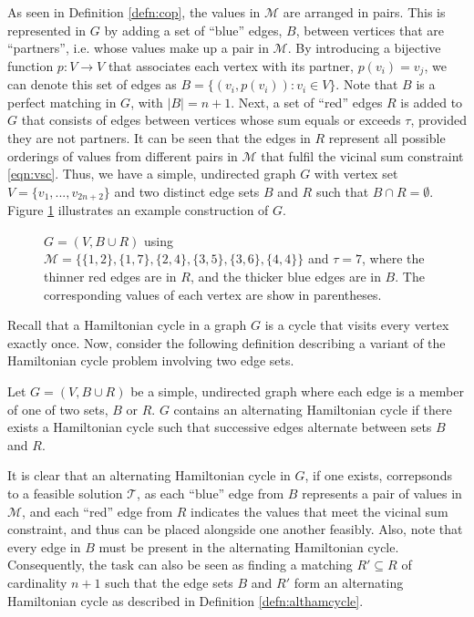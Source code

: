 \documentclass[runningheads]{llncs}
\begin{document}
As seen in Definition \ref{defn:cop}, the values in $\mathcal{M}$ are arranged in pairs. This is represented in $G$ by adding a set of ``blue'' edges, $B$, between vertices that are ``partners'', i.e. whose values make up a pair in $\mathcal{M}$. By introducing a bijective function $p: V \to V$ that associates each vertex with its partner, $p(v_i) = v_j$, we can denote this set of edges as $B = \{(v_i, p(v_i)) : v_i \in V\}$. Note that $B$ is a perfect matching in $G$, with $|B| = n+1$. Next, a set of ``red'' edges $R$ is added to $G$ that consists of edges between vertices whose sum equals or exceeds $\tau$, provided they are not partners. It can be seen that the edges in $R$ represent all possible orderings of values from different pairs in $\mathcal{M}$ that fulfil the vicinal sum constraint \eqref{eqn:vsc}. Thus, we have a simple, undirected graph $G$ with vertex set $V = \{v_1, ..., v_{2n+2}\}$ and two distinct edge sets $B$ and $R$ such that $B \cap R = \emptyset$. Figure \ref{fig:threshold} illustrates an example construction of $G$. 
\begin{figure}[h!]	
\centering
	
	\caption{$G = (V, B \cup R)$ using $\mathcal{M} = \{\{1,2\}, \{1,7\}, \{2,4\}, \{3,5\}, \{3,6\}, \{4,4\}\}$ and $\tau = 7$, where the thinner red edges are in $R$, and the thicker blue edges are in $B$. The corresponding values of each vertex are show in parentheses.}
	\label{fig:threshold}
\end{figure}

\noindent Recall that a Hamiltonian cycle in a graph $G$ is a cycle that visits every vertex exactly once. Now, consider the following definition describing a variant of the Hamiltonian cycle problem involving two edge sets.

\begin{definition}
	\label{defn:althamcycle}
	Let $G = (V, B \cup R)$ be a simple, undirected graph where each edge is a member of one of two sets, $B$ or $R$. $G$ contains an alternating Hamiltonian cycle if there exists a Hamiltonian cycle such that successive edges alternate between sets $B$ and $R$.
\end{definition}

\noindent It is clear that an alternating Hamiltonian cycle in $G$, if one exists, correpsonds to a feasible solution $\mathcal{T}$, as each ``blue'' edge from $B$ represents a pair of values in $\mathcal{M}$, and each ``red'' edge from $R$ indicates the values that meet the vicinal sum constraint, and thus can be placed alongside one another feasibly. Also, note that every edge in $B$ must be present in the alternating Hamiltonian cycle. Consequently, the task can also be seen as finding a matching $R' \subseteq R$ of cardinality $n+1$ such that the edge sets $B$ and $R'$ form an alternating Hamiltonian cycle as described in Definition \ref{defn:althamcycle}. 
\end{document}
